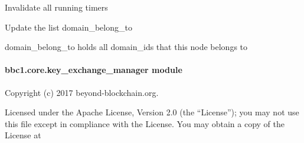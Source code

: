 \documentclass[letterpaper,10pt,english]{sphinxmanual}
\begin{document}
\begin{fulllineitems}
\begin{fulllineitems}
\begin{quote}
\begin{description}
\end{description}\end{quote}

\end{fulllineitems}


\begin{fulllineitems}
\label{\detokenize{bbc1.core.domain0_manager:bbc1.core.domain0_manager.Domain0Manager.stop_all_timers}}
Invalidate all running timers

\end{fulllineitems}


\begin{fulllineitems}
\label{\detokenize{bbc1.core.domain0_manager:bbc1.core.domain0_manager.Domain0Manager.update_domain_belong_to}}
Update the list domain\_belong\_to

domain\_belong\_to holds all domain\_ids that this node belongs to

\end{fulllineitems}


\end{fulllineitems}



\paragraph{bbc1.core.key\_exchange\_manager module}
\label{\detokenize{bbc1.core.key_exchange_manager:bbc1-core-key-exchange-manager-module}}\label{\detokenize{bbc1.core.key_exchange_manager:module-bbc1.core.key_exchange_manager}}\label{\detokenize{bbc1.core.key_exchange_manager::doc}}
Copyright (c) 2017 beyond-blockchain.org.

Licensed under the Apache License, Version 2.0 (the “License”);
you may not use this file except in compliance with the License.
You may obtain a copy of the License at
\begin{quote}

\end{quote}
\end{document}
